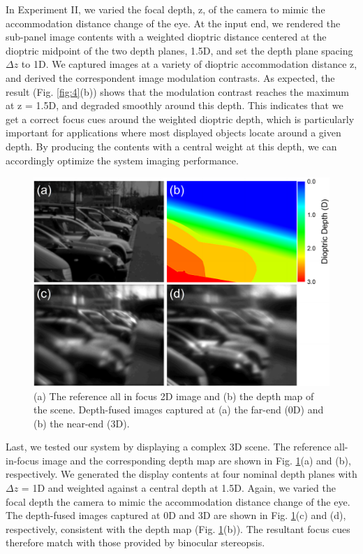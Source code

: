 \documentclass[9pt,twocolumn,twoside]{osajnl}
\begin{document}
In Experiment II, we varied the focal depth, z, of the camera to mimic the accommodation distance change of the eye. At the input end, we rendered the sub-panel image contents with a weighted dioptric distance centered at the dioptric midpoint of the two depth planes, 1.5D, and set the depth plane spacing $\Delta z$ to 1D.  We captured images at a variety of dioptric accommodation distance z, and derived the correspondent image modulation contrasts.  As expected, the result (Fig. \ref{fig:4}(b)) shows that the modulation contrast reaches the maximum at z = 1.5D, and degraded smoothly around this depth. This indicates that we get a correct focus cues around the weighted dioptric depth, which is particularly important for applications where most displayed objects locate around a given depth. By producing the contents with a central weight at this depth, we can accordingly optimize the system imaging performance.

\begin{figure}[htbp]
\centering
\includegraphics[width=\linewidth]{OMNIfig5}
\caption{(a) The reference all in focus 2D image and (b) the depth map of the scene.  Depth-fused images captured at (a) the far-end (0D) and (b) the near-end (3D). }
\label{fig:5}
\end{figure}

Last, we tested our system by displaying a complex 3D scene.  The reference all-in-focus image and the corresponding depth map are shown in Fig. \ref{fig:5}(a) and (b), respectively.  We generated the display contents at four nominal depth planes with $\Delta z$ = 1D and weighted against a central depth at 1.5D.  Again, we varied the focal depth the camera to mimic the accommodation distance change of the eye. The depth-fused images captured at 0D and 3D are shown in Fig. \ref{fig:5}(c) and (d), respectively, consistent with the depth map (Fig. \ref{fig:5}(b)). The resultant focus cues therefore match with those provided by binocular stereopsis. 
\end{document}
